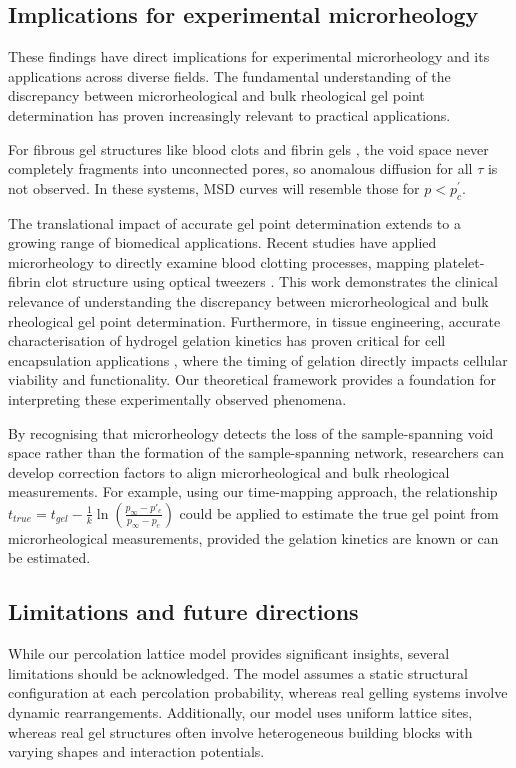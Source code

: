 \documentclass[%
 aip,
 amsmath,amssymb,
reprint, onecolumn %
]{revtex4-1}
\begin{document}
\subsection{Implications for experimental microrheology}

These findings have direct implications for experimental microrheology and its applications across diverse fields. The fundamental understanding of the discrepancy between microrheological and bulk rheological gel point determination has proven increasingly relevant to practical applications.

For fibrous gel structures like blood clots \cite{Evans2010a,Evans2010b} and fibrin gels \cite{Curtis2013}, the void space never completely fragments into unconnected pores, so anomalous diffusion for all $\tau$ is not observed. In these systems, MSD curves will resemble those for $p < p_{c}^{'}$.

The translational impact of accurate gel point determination extends to a growing range of biomedical applications. Recent studies have applied microrheology to directly examine blood clotting processes, mapping platelet-fibrin clot structure using optical tweezers \cite{Ferri2022}. This work demonstrates the clinical relevance of understanding the discrepancy between microrheological and bulk rheological gel point determination. Furthermore, in tissue engineering, accurate characterisation of hydrogel gelation kinetics has proven critical for cell encapsulation applications \cite{Kotecki2019}, where the timing of gelation directly impacts cellular viability and functionality. Our theoretical framework provides a foundation for interpreting these experimentally observed phenomena.

By recognising that microrheology detects the loss of the sample-spanning void space rather than the formation of the sample-spanning network, researchers can develop correction factors to align microrheological and bulk rheological measurements. For example, using our time-mapping approach, the relationship $t_{true} = t_{gel} - \frac{1}{k}\ln\left(\frac{p_\infty-p'_c}{p_\infty-p_c}\right)$ could be applied to estimate the true gel point from microrheological measurements, provided the gelation kinetics are known or can be estimated.

\subsection{Limitations and future directions}

While our percolation lattice model provides significant insights, several limitations should be acknowledged. The model assumes a static structural configuration at each percolation probability, whereas real gelling systems involve dynamic rearrangements. Additionally, our model uses uniform lattice sites, whereas real gel structures often involve heterogeneous building blocks with varying shapes and interaction potentials.
\end{document}
